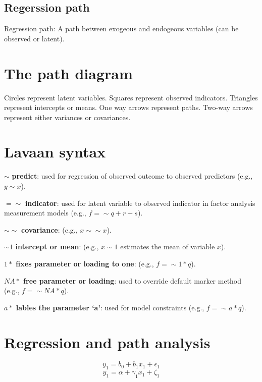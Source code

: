 \documentclass[]{book}
\begin{document}
\hypertarget{regerssion-path}{%
\subsection{Regerssion path}\label{regerssion-path}}

Regression path: A path between exogeous and endogeous variables (can be observed or latent).

\hypertarget{the-path-diagram}{%
\section{The path diagram}\label{the-path-diagram}}

Circles represent latent variables. Squares represent observed indicators. Triangles represent intercepts or means. One way arrows represent paths. Two-way arrows represent either variances or covariances.

\hypertarget{lavaan-syntax}{%
\section{Lavaan syntax}\label{lavaan-syntax}}

\(\sim\) \textbf{predict}: used for regression of observed outcome to observed predictors (e.g., \(y \sim x\)).

\(= \sim\) \textbf{indicator}: used for latent variable to observed indicator in factor analysis measurement models (e.g., \(f= \sim q+r+s\)).

\(\sim \sim\) \textbf{covariance}: (e.g., \(x \sim \sim x\)).

\(\sim 1\) \textbf{intercept or mean}: (e.g., \(x \sim 1\) estimates the mean of variable \(x\)).

\(1*\) \textbf{fixes parameter or loading to one}: (e.g., \(f =\sim 1*q\)).

\(NA *\) \textbf{free parameter or loading}: used to override default marker method (e.g., \(f=\sim NA * q\)).

\(a*\) \textbf{lables the parameter `a'}: used for model constraints (e.g., \(f=\sim a*q\)).

\hypertarget{regression-and-path-analysis}{%
\section{Regression and path analysis}\label{regression-and-path-analysis}}

\[y_{1}=b_{0}+b_{1}x_{1}+\epsilon_{1}\]
\[y_{1}=\alpha+\gamma_{1} x_{1}+\zeta_{1}\]
\end{document}
